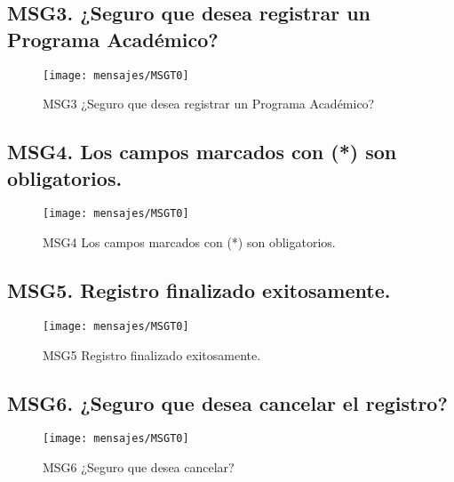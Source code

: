 \subsection{MSG3. ¿Seguro que desea registrar un Programa Académico?}
    \begin{figure}[htbp]
        \begin{center}
            \texttt{[image: mensajes/MSGT0]}
            \caption{MSG3 ¿Seguro que desea registrar un Programa Académico?}
            \label{fig:MSG3}
        \end{center}
    \end{figure}

\subsection{MSG4. Los campos marcados con (*) son obligatorios.}
    \begin{figure}[htbp]
        \begin{center}
            \texttt{[image: mensajes/MSGT0]}
            \caption{MSG4 Los campos marcados con (*) son obligatorios.}
            \label{fig:MSG4}
        \end{center}
    \end{figure}

\subsection{MSG5. Registro finalizado exitosamente.}
    \begin{figure}[htbp]
        \begin{center}
            \texttt{[image: mensajes/MSGT0]}
            \caption{MSG5 Registro finalizado exitosamente.}
            \label{fig:MSG5}
        \end{center}
    \end{figure}

\subsection{MSG6. ¿Seguro que desea cancelar el registro?}
    \begin{figure}[htbp]
        \begin{center}
            \texttt{[image: mensajes/MSGT0]}
            \caption{MSG6 ¿Seguro que desea cancelar?}
            \label{fig:MSG6}
        \end{center}
    \end{figure}

